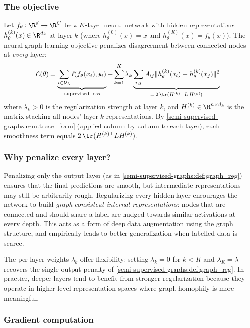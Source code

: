 \begin{notechapter}
\subsubsection*{The objective}

Let $f_\theta: \R^d \to \R^C$ be a $K$-layer neural network with hidden
representations $h_\theta^{(k)}(x) \in \R^{d_k}$ at layer $k$ (where
$h_\theta^{(0)}(x) = x$ and $h_\theta^{(K)}(x) = f_\theta(x)$). The neural
graph learning objective penalizes disagreement between connected nodes at
\emph{every} layer:
\begin{equation}
\label{semi-supervised-graphs:eq:neural_graph}
\mathcal{L}(\theta) = \underbrace{\sum_{i \in \mathcal{V}_L}
\ell(f_\theta(x_i), y_i)}_{\text{supervised loss}} +
\sum_{k=1}^K \lambda_k
\underbrace{\sum_{i,j}A_{ij}\|h_\theta^{(k)}(x_i) -
h_\theta^{(k)}(x_j)\|^2}_{= \,2\,\tr(H^{(k)\top} L\, H^{(k)})}
\end{equation}
where $\lambda_k > 0$ is the regularization strength at layer $k$, and
$H^{(k)} \in \R^{n \times d_k}$ is the matrix stacking all nodes' layer-$k$
representations. By \cref{semi-supervised-graphs:rem:trace_form} (applied column by column to
each layer), each smoothness term equals $2\,\tr(H^{(k)\top} L H^{(k)})$.

\subsubsection*{Why penalize every layer?}

Penalizing only the output layer (as in \cref{semi-supervised-graphs:def:graph_reg}) ensures
that the final predictions are smooth, but intermediate representations may
still be arbitrarily rough. Regularizing every hidden layer encourages the
network to build \emph{graph-consistent internal representations}: nodes that
are connected and should share a label are nudged towards similar activations at
every depth. This acts as a form of deep data augmentation using the graph
structure, and empirically leads to better generalization when labelled data is
scarce.

The per-layer weights $\lambda_k$ offer flexibility: setting $\lambda_k = 0$
for $k < K$ and $\lambda_K = \lambda$ recovers the single-output penalty of
\cref{semi-supervised-graphs:def:graph_reg}. In practice, deeper layers tend to benefit
from stronger regularization because they operate in higher-level representation
spaces where graph homophily is more meaningful.

\subsubsection*{Gradient computation}


\end{notechapter}
